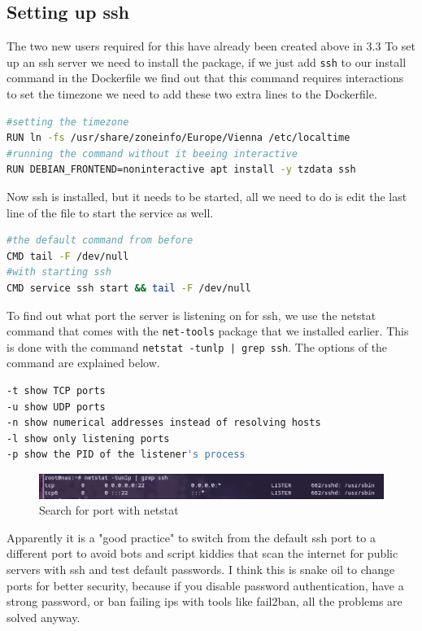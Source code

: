 \documentclass[a4paper]{article}
\newcommand{\abc}{\hfill \break}
\begin{document}
\subsection {Setting up ssh}
The two new users required for this have already been created above in 3.3 \abc
To set up an ssh server we need to install the package, if we just add \texttt{ssh} to our install command in the Dockerfile we find out that this command requires interactions to set the timezone we need to add these two extra lines to the Dockerfile.
\begin{lstlisting}[language=bash]
#setting the timezone
RUN ln -fs /usr/share/zoneinfo/Europe/Vienna /etc/localtime
#running the command without it beeing interactive
RUN DEBIAN_FRONTEND=noninteractive apt install -y tzdata ssh
\end{lstlisting}
Now ssh is installed, but it needs to be started, all we need to do is edit the last line of the file to start the service as well.
\begin{lstlisting}[language=bash]
#the default command from before
CMD tail -F /dev/null
#with starting ssh
CMD service ssh start && tail -F /dev/null
\end{lstlisting}
To find out what port the server is listening on for ssh, we use the netstat command that comes with the \texttt{net-tools} package that we installed earlier.
This is done with the command \texttt{netstat -tunlp | grep ssh}. The options of the command are explained below.
\begin{lstlisting}[language=bash]
-t show TCP ports
-u show UDP ports
-n show numerical addresses instead of resolving hosts
-l show only listening ports
-p show the PID of the listener's process
\end{lstlisting}\cite{netstat}
\begin{figure}[h]
	\centering
	\includegraphics[scale=0.4]{images/netstatssh.png}
	\caption{Search for port with netstat}
\end{figure} \abc
Apparently it is a "good practice" to switch from the default ssh port to a different port to avoid bots and script kiddies that scan the internet for public servers with ssh and test default passwords. I think this is snake oil to change ports for better security, because if you disable password authentication, have a strong password, or ban failing ips with tools like fail2ban, all the problems are solved anyway.\cite{hardening-linux-video} \abc
\end{document}
